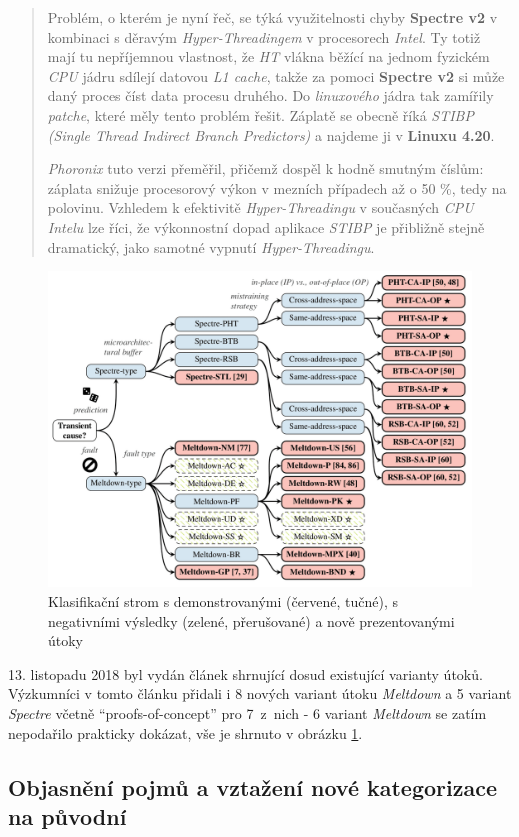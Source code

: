 \begin{quote}
    Problém, o kterém je nyní řeč, se týká využitelnosti chyby \textbf{Spectre v2} v kombinaci s děravým \textit{Hyper-Threadingem} v procesorech \textit{Intel}.
    Ty totiž mají tu nepříjemnou vlastnost, že \textit{HT} vlákna běžící na jednom fyzickém \textit{CPU} jádru sdílejí datovou \textit{L1 cache}, takže za pomoci \textbf{Spectre v2} si může daný proces číst data procesu druhého.
    Do \textit{linuxového} jádra tak zamířily \textit{patche}, které měly tento problém řešit.
    Záplatě se obecně říká \textit{STIBP (Single Thread Indirect Branch Predictors)} a najdeme ji v \textbf{Linuxu 4.20}.
    
    \textit{Phoronix} tuto verzi přeměřil, přičemž dospěl k hodně smutným číslům: záplata snižuje procesorový výkon v mezních případech až o 50 \%, tedy na polovinu.
    Vzhledem k efektivitě \textit{Hyper-Threadingu} v současných \textit{CPU Intelu} lze říci, že výkonnostní dopad aplikace \textit{STIBP} je přibližně stejně dramatický, jako samotné vypnutí \textit{Hyper-Threadingu}.
\end{quote}

\begin{figure}[htbp]
    \includegraphics[width=.6\textwidth]{img/klasifikace-spectre-meltdown.png}
    \centering
    \caption{Klasifikační strom s demonstrovanými (červené, tučné), s negativními výsledky (zelené, přerušované) a nově prezentovanými útoky}
    \label{img:klasifikace}
\end{figure}
\FloatBarrier

13. listopadu 2018 byl vydán článek shrnující dosud existující varianty útoků.
Výzkumníci v tomto článku přidali i 8 nových variant útoku \textit{Meltdown} a 5 variant \textit{Spectre} včetně \enquote{proofs-of-concept} pro 7~z~nich - 6 variant \textit{Meltdown} se zatím nepodařilo prakticky dokázat, vše je shrnuto v obrázku \ref{img:klasifikace}.

\subsection{Objasnění pojmů a vztažení nové kategorizace na původní}

